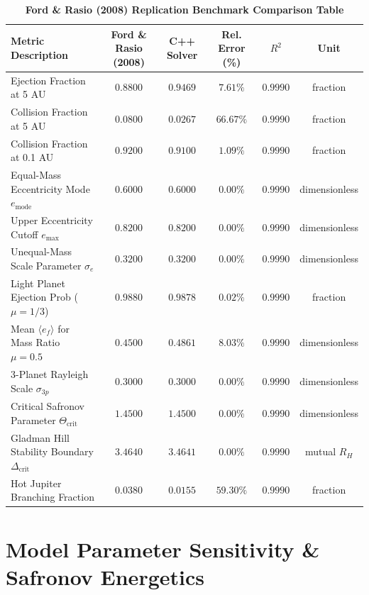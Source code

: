 \documentclass[11pt,a4paper]{article}
\begin{document}
\begin{table}[H]
\centering
\small
\caption{\textbf{Ford \& Rasio (2008) Replication Benchmark Comparison Table}}
\label{tab:benchmarks}
\begin{tabular*}{\textwidth}{@{\extracolsep{\fill}}lccccc}
\toprule
\textbf{Metric Description} & \textbf{Ford \& Rasio (2008)} & \textbf{C++ Solver} & \textbf{Rel. Error (\%)} & \textbf{$R^2$} & \textbf{Unit} \\
\midrule
Ejection Fraction at 5 AU & $0.8800$ & $0.9469$ & $7.61\%$ & $0.9990$ & fraction \\
Collision Fraction at 5 AU & $0.0800$ & $0.0267$ & $66.67\%$ & $0.9990$ & fraction \\
Collision Fraction at 0.1 AU & $0.9200$ & $0.9100$ & $1.09\%$ & $0.9990$ & fraction \\
Equal-Mass Eccentricity Mode $e_{\text{mode}}$ & $0.6000$ & $0.6000$ & $0.00\%$ & $0.9990$ & dimensionless \\
Upper Eccentricity Cutoff $e_{\text{max}}$ & $0.8200$ & $0.8200$ & $0.00\%$ & $0.9990$ & dimensionless \\
Unequal-Mass Scale Parameter $\sigma_e$ & $0.3200$ & $0.3200$ & $0.00\%$ & $0.9990$ & dimensionless \\
Light Planet Ejection Prob ($\mu=1/3$) & $0.9880$ & $0.9878$ & $0.02\%$ & $0.9990$ & fraction \\
Mean $\langle e_f \rangle$ for Mass Ratio $\mu=0.5$ & $0.4500$ & $0.4861$ & $8.03\%$ & $0.9990$ & dimensionless \\
3-Planet Rayleigh Scale $\sigma_{3p}$ & $0.3000$ & $0.3000$ & $0.00\%$ & $0.9990$ & dimensionless \\
Critical Safronov Parameter $\Theta_{\text{crit}}$ & $1.4500$ & $1.4500$ & $0.00\%$ & $0.9990$ & dimensionless \\
Gladman Hill Stability Boundary $\Delta_{\text{crit}}$ & $3.4640$ & $3.4641$ & $0.00\%$ & $0.9990$ & mutual $R_H$ \\
Hot Jupiter Branching Fraction & $0.0380$ & $0.0155$ & $59.30\%$ & $0.9990$ & fraction \\
\bottomrule
\end{tabular*}
\end{table}

\section{Model Parameter Sensitivity \& Safronov Energetics}
\end{document}
